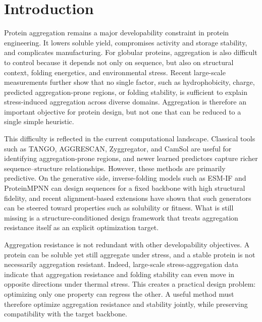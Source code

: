 \documentclass[pdflatex,sn-mathphys-num]{sn-jnl}%
\theoremstyle{thmstyleone}%
\theoremstyle{thmstyletwo}%
\theoremstyle{thmstylethree}%
\begin{document}
\maketitle

\section{Introduction}\label{sec1}

Protein aggregation remains a major developability constraint in protein engineering. It lowers soluble yield, compromises activity and storage stability, and complicates manufacturing. For globular proteins, aggregation is also difficult to control because it depends not only on sequence, but also on structural context, folding energetics, and environmental stress. Recent large-scale measurements further show that no single factor, such as hydrophobicity, charge, predicted aggregation-prone regions, or folding stability, is sufficient to explain stress-induced aggregation across diverse domains. Aggregation is therefore an important objective for protein design, but not one that can be reduced to a single simple heuristic.

This difficulty is reflected in the current computational landscape. Classical tools such as TANGO, AGGRESCAN, Zyggregator, and CamSol are useful for identifying aggregation-prone regions, and newer learned predictors capture richer sequence--structure relationships. However, these methods are primarily predictive. On the generative side, inverse-folding models such as ESM-IF and ProteinMPNN can design sequences for a fixed backbone with high structural fidelity, and recent alignment-based extensions have shown that such generators can be steered toward properties such as solubility or fitness. What is still missing is a structure-conditioned design framework that treats aggregation resistance itself as an explicit optimization target.

Aggregation resistance is not redundant with other developability objectives. A protein can be soluble yet still aggregate under stress, and a stable protein is not necessarily aggregation resistant. Indeed, large-scale stress-aggregation data indicate that aggregation resistance and folding stability can even move in opposite directions under thermal stress. This creates a practical design problem: optimizing only one property can regress the other. A useful method must therefore optimize aggregation resistance and stability jointly, while preserving compatibility with the target backbone.
\end{document}
